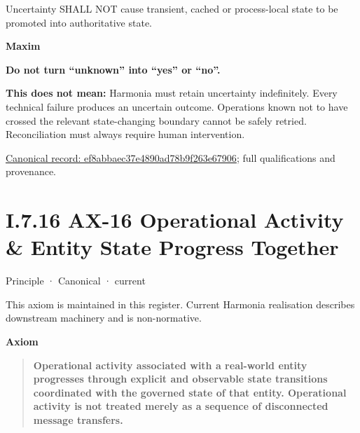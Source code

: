 Uncertainty SHALL NOT cause transient, cached or process-local state to be promoted into authoritative state.



\par\medskip\textbf{Maxim}\par


\textbf{Do not turn “unknown” into “yes” or “no”.}



\textbf{This does not mean:} Harmonia must retain uncertainty indefinitely. Every technical failure produces an uncertain outcome. Operations known not to have crossed the relevant state-changing boundary cannot be safely retried. Reconciliation must always require human intervention.


{\footnotesize \href{../../../../../../../continuum/motivation/principle/ef8abbaec37e4890ad78b9f263e67906.md}{Canonical record: ef8abbaec37e4890ad78b9f263e67906}; full qualifications and provenance.}\par
\section*{I.7.16 AX-16 Operational Activity \& Entity State Progress Together}
\label{navigation:I.7.16}

\label{element:de7e90f46127455a9ec9ad3b9b48ba54}
{\small Principle · Canonical · current}\par

This axiom is maintained in this register. Current Harmonia realisation describes downstream machinery and is non-normative.



\par\medskip\textbf{Axiom}\par


\begin{quote}


\textbf{Operational activity associated with a real-world entity progresses through explicit and observable state transitions coordinated with the governed state of that entity. Operational activity is not treated merely as a sequence of disconnected message transfers.}



\end{quote}


